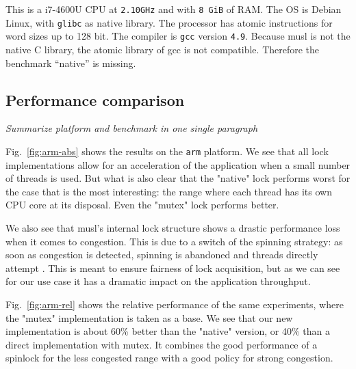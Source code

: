 This is a i7-4600U CPU at \texttt{2.10GHz} and with \texttt{8 GiB} of RAM. The
OS is Debian Linux, with \texttt{glibc} as native library.  The processor
has atomic instructions for word sizes up to 128 bit. The compiler
is \texttt{gcc} version \texttt{4.9}.
%
Because musl is not the native C library, the atomic library of gcc is not
compatible. Therefore the benchmark ``native'' is missing.

\subsection{Performance comparison}
\label{sec-4-4}
\else
\emph{Summarize platform and benchmark in one single paragraph}
\fi


Fig.~\ref{fig:arm-abs} shows the results on the \texttt{arm}
platform.
%
We see that all lock implementations allow for an acceleration of
the application when a small number of threads is used. But what is
also clear that the "native" lock performs worst for the case that
is the most interesting: the range where each thread has
its own CPU core at its disposal. Even the "mutex" lock performs better.

We also see that musl's internal lock structure shows a drastic
performance loss when it comes to congestion. This is due to a
switch of the spinning strategy: as soon as congestion is detected,
spinning is abandoned and threads directly attempt
. This is meant to ensure fairness of lock acquisition,
but as we can see for our use case it has a dramatic impact on the
application throughput.

Fig.~\ref{fig:arm-rel} shows the relative performance of the same
experiments, where the "mutex" implementation is taken as a base.
%
We see that our new implementation is about 60\% better than
the "native" version, or 40\% than a direct implementation with
mutex. It combines the good performance of a spinlock for the less
congested range with a good policy for strong congestion.

